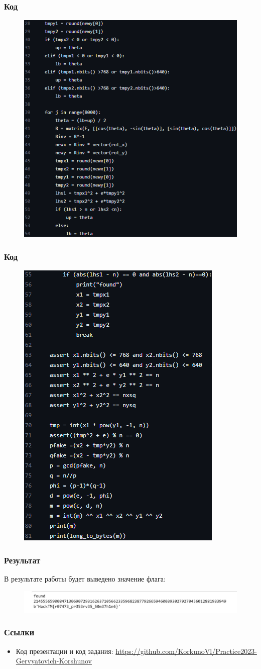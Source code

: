 \documentclass[t]{beamer}
\begin{document}
\begin{frame}[c]
    \frametitle{Код}
		\begin{figure}
		     \centering
		     \includegraphics[width=0.65\linewidth]{Code2.png}
		     \label{fig:my_label}
		 \end{figure}
\end{frame}

\begin{frame}[c]
    \frametitle{Код}
		\begin{figure}
		     \centering
		     \includegraphics[width=0.46\linewidth]{Code3.png}
		     \label{fig:my_label}
		 \end{figure}
\end{frame}

\begin{frame}[c]
	\begin{block}{}
    \frametitle{Результат}
		 {В результате работы будет выведено значение флага:}
	\end{block}
    \begin{figure}
		     \centering
		     \includegraphics[width=1\linewidth]{Result.jpg}
		     \label{fig:my_label}
		 \end{figure}
\end{frame}

\begin{frame}[c]
    \frametitle{Ссылки}
	\begin{itemize}
		\item Код презентации и код задания: \href{https://github.com/KorkunoVl/Practice2023-Gervyatovich-Korshunov}{https://github.com/KorkunoVl/Practice2023-Gervyatovich-Korshunov}
	\end{itemize}	
\end{frame}
\end{document}
